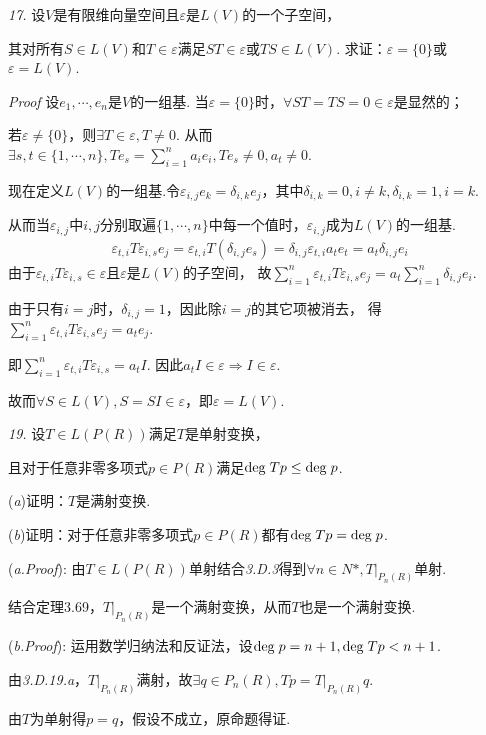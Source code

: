 \newpage

\textit{17.}
设\(V\)是有限维向量空间且\(\varepsilon\)是\(L(V)\)的一个子空间，

其对所有\(S \in L(V)\)和\(T \in \varepsilon\)满足\(ST \in \varepsilon\)或\(TS \in L(V)\).
求证：\(\varepsilon=\{0\}\)或\(\varepsilon=L(V)\).

\textit{Proof}
设\(e_1,\cdots,e_n\)是\(V\)的一组基.
当\(\varepsilon =\{0\}\)时，\(\forall ST=TS=0 \in \varepsilon\)是显然的；

若\(\varepsilon \ne \{0\}\)，则\(\exists T \in \varepsilon, T \ne 0\).
从而\(\exists s,t \in \{1,\cdots,n\},Te_s=\sum_{i=1}^n a_ie_i ,Te_s \ne 0, a_t \ne 0\).

现在定义\(L(V)\)的一组基.令\(\varepsilon_{i,j}e_k=\delta_{i,k}e_j\)，其中\(\delta_{i,k}=0,i \ne k,\delta_{i,k}=1,i=k\).

从而当\(\varepsilon_{i,j}\)中\(i,j\)分别取遍\(\{1,\cdots,n\}\)中每一个值时，\(\varepsilon_{i,j}\)成为\(L(V)\)的一组基.
    \begin{align*}
        \varepsilon_{t,i}T\varepsilon_{i,s}e_j=\varepsilon_{t,i}T(\delta_{i,j} e_s) 
        =\delta_{i,j}\varepsilon_{t,i}a_te_t=a_t\delta_{i,j}e_i
    \end{align*}
由于\(\varepsilon_{t,i}T\varepsilon_{i,s} \in \varepsilon\)且\(\varepsilon\)是\(L(V)\)的子空间，
故\(\sum_{i=1}^n \varepsilon_{t,i}T\varepsilon_{i,s}e_j=a_t \sum_{i=1}^n \delta_{i,j}e_i\).

由于只有\(i=j\)时，\(\delta_{i,j}=1\)，因此除\(i=j\)的其它项被消去，
得\(\sum_{i=1}^n \varepsilon_{t,i} T \varepsilon_{i,s} e_j=a_te_j\).

即\(\sum_{i=1}^n \varepsilon_{t,i} T \varepsilon_{i,s} =a_t I\).
因此\(a_t I \in \varepsilon \Rightarrow I \in \varepsilon\).

故而\(\forall S \in L(V),S=SI \in \varepsilon\)，即\(\varepsilon=L(V)\).

\hspace*{\fill}

\textit{19.}
设\(T \in L(P(R))\)满足\(T\)是单射变换，

且对于任意非零多项式\(p \in P(R)\)满足\(\mathrm{deg \;} Tp \leq \mathrm{deg \;} p\).

(\textit{a})证明：\(T\)是满射变换.

(\textit{b})证明：对于任意非零多项式\(p \in P(R)\)都有\(\mathrm{deg \;} Tp=\mathrm{deg \;} p\).

(\textit{a.Proof}):
由\(T \in L(P(R))\)单射结合\textit{3.D.3}得到\(\forall n \in N*,T|_{P_n(R)}\)单射.

结合定理3.69，\(T|_{P_n(R)}\)是一个满射变换，从而\(T\)也是一个满射变换.

(\textit{b.Proof}):
运用数学归纳法和反证法，设\(\mathrm{deg \;} p=n+1,\mathrm{deg \;} Tp<n+1\).

由\textit{3.D.19.a}，\(T|_{P_n(R)}\)满射，故\(\exists q \in P_n(R),Tp=T|_{P_n(R)}q\).

由\(T\)为单射得\(p=q\)，假设不成立，原命题得证.


